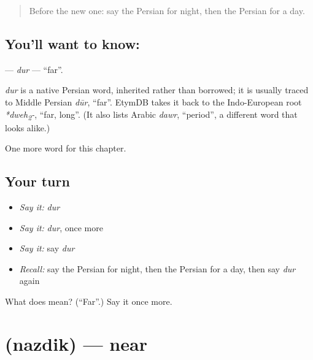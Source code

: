 \label{lesson:FA-C67-dur}



\begin{quote}
Before the new one: say the Persian for night, then the Persian for a day.
\end{quote}

\subsection*{You'll want to know: }
\textbf{} — \emph{dur} — \textquotedblleft{}far\textquotedblright{}.

\begin{cousinweb}
\emph{dur} is a native Persian word, inherited rather than borrowed; it is usually traced to Middle Persian \emph{dūr}, \textquotedblleft{}far\textquotedblright{}. EtymDB takes it back to the Indo-European root \emph{*dweh\textsubscript{2}-}, \textquotedblleft{}far, long\textquotedblright{}. (It also lists Arabic \emph{dawr}, \textquotedblleft{}period\textquotedblright{}, a different word that looks alike.)
\end{cousinweb}

\begin{grammarlens}[title={What you've built}]
One more word for this chapter.
\end{grammarlens}

\subsection*{Your turn}
\begin{itemize}
\raggedright
  \item \emph{Say it:} \emph{dur}
  \item \emph{Say it:} \emph{dur}, once more
  \item \emph{Say it:} say \emph{dur}
  \item \emph{Recall:} say the Persian for night, then the Persian for a day, then say \emph{dur} again
\end{itemize}

\begin{tcolorbox}[breakable,colback=teal!4,colframe=teal!35!black,title={Before you move on}]
What does  mean? (\textquotedblleft{}Far\textquotedblright{}.) Say it once more.
\end{tcolorbox}
\section[\texorpdfstring{\fa{نزدیک} (nazdik)}{نزدیک (nazdik)}]{ (nazdik) — near}

